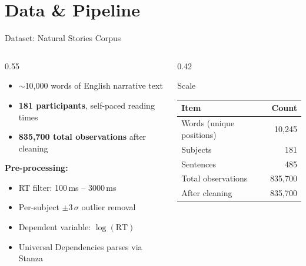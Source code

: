\documentclass[aspectratio=169]{beamer}
\begin{document}
\section{Data \& Pipeline}

\begin{frame}{Dataset: Natural Stories Corpus}

  \begin{columns}[T]
    \begin{column}{0.55\textwidth}
      \begin{itemize}
        \item $\sim$10,000 words of English narrative text
        \item \textbf{181 participants}, self-paced reading times
        \item \textbf{835,700 total observations} after cleaning
      \end{itemize}

      \vspace{0.8em}
      \textbf{Pre-processing:}
      \begin{itemize}
        \item RT filter: 100\,ms -- 3000\,ms
        \item Per-subject $\pm3\,\sigma$ outlier removal
        \item Dependent variable: $\log(\text{RT})$
        \item Universal Dependencies parses via Stanza
      \end{itemize}
    \end{column}
    \begin{column}{0.42\textwidth}
      \begin{exampleblock}{Scale}
        \centering
        \begin{tabular}{lr}
          \toprule
          Item & Count \\
          \midrule
          Words (unique positions) & 10,245 \\
          Subjects & 181 \\
          Sentences & 485 \\
          Total observations & 835,700 \\
          After cleaning & 835,700 \\
          \bottomrule
        \end{tabular}
      \end{exampleblock}
    \end{column}
  \end{columns}
\end{frame}
\end{document}
